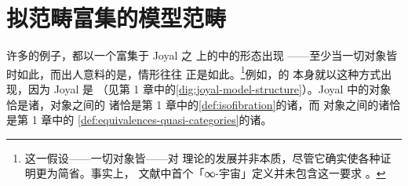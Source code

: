 
\providecommand{\Fun}{\operatorname{Fun}}
\providecommand{\Cat}{\mathcal{C}at}
\providecommand{\sSet}{s\mathcal{S}et}
\providecommand{\QCat}{\mathcal{Q}\mathcal{C}at}
\providecommand{\Disc}{\mathcal{D}\mathrm{isc}}  %
\providecommand{\qcOne}{\mathbf{1}}   %
\providecommand{\qcInt}{\mathbb{I}}   %
\providecommand{\rvWarrow}{\rightsquigarrow}%
\providecommand{\rvFarrow}{\twoheadrightarrow}%

\section{拟范畴富集的模型范畴}\label{sec:quasi-categorically-enriched-model-categories}

许多\trInfinityCosmos{}的例子，都以一个富集于 Joyal \trModelStructure{}之%
\trSimplicialSet{}上的\trModelCategory{}中\trCategoryOfFibrantObjects{}的形态出现%
——至少当一切\trFibrant{}对象皆\trCofibrant{}时如此，而出人意料的是，情形往往%
正是如此。\footnote{这一假设——一切\trFibrant{}对象皆\trCofibrant{}——对%
\trInfinityCategory{}理论的发展并非本质，尽管它确实使各种证明更为简省。事实上，
文献中首个「∞-宇宙」定义并未包含这一要求 \cite{bib110}。}例如，\trQuasiCategory{}的%
\trInfinityCosmos{}本身就以这种方式出现，因为 Joyal \trModelStructure{}是%
\trCartesianClosed{}（见第 1 章中的\cref{dig:joyal-model-structure}）。Joyal
\trModelStructure{}中的\trFibrant{}对象恰是诸\trQuasiCategory，\trFibrant{}对象之间的%
诸\trFibration{}恰是第 1 章中的\cref{def:isofibration}的诸\trIsofibration，而%
\trFibrant{}对象之间的诸\trWeakEquivalence{}恰是第 1 章中的%
\cref{def:equivalences-quasi-categories}的诸\trEquivalence。

